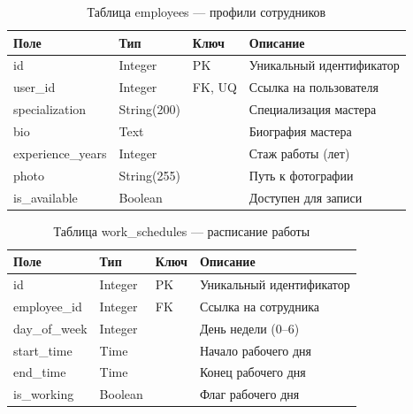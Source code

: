 \documentclass[14pt,a4paper,oneside]{extarticle}
\begin{document}
\begin{table}[H]
\caption{Таблица employees --- профили сотрудников}\label{tab:employees}
\centering
\begin{tabularx}{\textwidth}{|l|l|l|X|}
\hline
\textbf{Поле} & \textbf{Тип} & \textbf{Ключ} & \textbf{Описание} \\
\hline
id & Integer & PK & Уникальный идентификатор \\
\hline
user\_id & Integer & FK, UQ & Ссылка на пользователя \\
\hline
specialization & String(200) & & Специализация мастера \\
\hline
bio & Text & & Биография мастера \\
\hline
experience\_years & Integer & & Стаж работы (лет) \\
\hline
photo & String(255) & & Путь к фотографии \\
\hline
is\_available & Boolean & & Доступен для записи \\
\hline
\end{tabularx}
\end{table}

\begin{table}[H]
\caption{Таблица work\_schedules --- расписание работы}\label{tab:schedules}
\centering
\begin{tabularx}{\textwidth}{|l|l|l|X|}
\hline
\textbf{Поле} & \textbf{Тип} & \textbf{Ключ} & \textbf{Описание} \\
\hline
id & Integer & PK & Уникальный идентификатор \\
\hline
employee\_id & Integer & FK & Ссылка на сотрудника \\
\hline
day\_of\_week & Integer & & День недели (0--6) \\
\hline
start\_time & Time & & Начало рабочего дня \\
\hline
end\_time & Time & & Конец рабочего дня \\
\hline
is\_working & Boolean & & Флаг рабочего дня \\
\hline
\end{tabularx}
\end{table}
\end{document}
